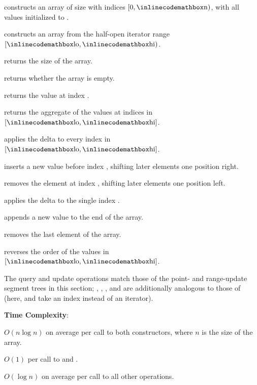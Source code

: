\begin{compactitem}
  \item {} constructs an array of size  with indices $[0, {\inlinecodemath{n}})$, with all values initialized to .
  \item {} constructs an array from the half-open iterator range $[{\inlinecodemath{lo}}, {\inlinecodemath{hi}})$.
  \item {} returns the size of the array.
  \item {} returns whether the array is empty.
  \item {} returns the value at index .
  \item {} returns the aggregate of the values at indices in $[{\inlinecodemath{lo}}, {\inlinecodemath{hi}}]$.
  \item {} applies the delta  to every index in $[{\inlinecodemath{lo}}, {\inlinecodemath{hi}}]$.
  \item {} inserts a new value  before index , shifting later elements one position right.
  \item {} removes the element at index , shifting later elements one position left.
  \item {} applies the delta  to the single index .
  \item {} appends a new value  to the end of the array.
  \item {} removes the last element of the array.
  \item {} reverses the order of the values in $[{\inlinecodemath{lo}}, {\inlinecodemath{hi}}]$.
\end{compactitem}

The query and update operations match those of the point- and range-update segment trees in this section; , , , and  are additionally analogous to those of  (here,  and  take an index instead of an iterator).

\textbf{Time Complexity}:
\begin{compactitem}
  \item $O(n \log n)$ on average per call to both constructors, where $n$ is the size of the array.
  \item $O(1)$ per call to  and .
  \item $O(\log n)$ on average per call to all other operations.
\end{compactitem}

